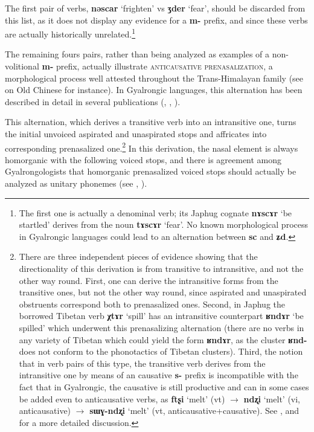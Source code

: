 \documentclass[oneside,a4paper,11pt]{article}
\newcommand{\ipa}[1]{\textbf{{\phon\mbox{#1}}}} %
\begin{document}
 The first pair of verbs, \ipa{nəscar} `frighten' vs \ipa{ʒder} `fear', should be discarded from this list, as it does not display any evidence for a \ipa{m-} prefix, and since these verbs are actually historically unrelated.\footnote{The first one is actually a denominal verb; its Japhug cognate \ipa{nɤscɤr} `be startled' derives from the noun \ipa{tɤscɤr} `fear'. No known morphological process in Gyalrongic languages could lead to an alternation between \ipa{sc} and \ipa{ʑd}.}

The remaining fours pairs, rather than being analyzed as examples of a non-volitional \ipa{m-} prefix, actually illustrate \textsc{anticausative prenasalization}, a morphological process well attested throughout the Trans-Himalayan family (see \citealt{sagart03prenasalized} on Old Chinese for instance). In Gyalrongic languages, this alternation has been described in detail in several publications (\citealt{lai13affixale}, \citealt{jacques15spontaneous}, \citealt{jacques15causative}). 

This alternation, which derives a transitive verb into an intransitive one, turns the initial unvoiced aspirated and unaspirated stops and affricates into corresponding prenasalized one.\footnote{There are three independent pieces of evidence showing that the directionality of this derivation is from transitive to intransitive, and not the other way round. First, one can derive the intransitive forms from the transitive ones, but not the other way round, since aspirated and unaspirated obstruents correspond both to prenasalized ones. Second, in Japhug the borrowed Tibetan verb \ipa{χtɤr} `spill' has an intransitive counterpart \ipa{ʁndɤr} `be spilled' which underwent this prenasalizing alternation (there are no verbs in any variety of Tibetan which could yield the form \ipa{ʁndɤr}, as the cluster \ipa{ʁnd-} does not conform to the phonotactics of Tibetan clusters). Third, the notion that in verb pairs of this type, the transitive verb derives from the intransitive one by means of an causative \ipa{s-} prefix is incompatible with the fact that in Gyalrongic, the causative is still productive and can in some cases be added even to anticausative verbs, as \ipa{ftʂi} `melt' (vt) $\rightarrow$ \ipa{ndʐi} `melt' (vi, anticausative) $\rightarrow$ \ipa{sɯɣ-ndʐi} `melt' (vt, anticausative+causative). See \citet{jacques15spontaneous}, \citet{jacques15causative} and \citet{gong17xingtaixue} for a more detailed discussion. } In this derivation, the nasal element is always homorganic with the following voiced stops, and there is agreement among Gyalrongologists that homorganic prenasalized voiced stops should actually be analyzed as unitary phonemes (see \citealt{jackson03caodeng}, \citealt[8-9]{jacques08}).
\end{document}
